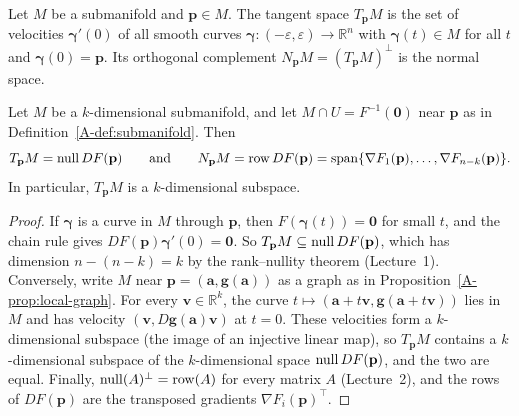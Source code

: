 \begin{definition}\label{A-def:tangent}
    Let $M$ be a submanifold and $\mathbf{p} \in M$. The tangent space $T_{\mathbf{p}}M$ is the set of velocities $\boldsymbol{\gamma}'(0)$ of all smooth curves $\boldsymbol{\gamma}: (-\varepsilon, \varepsilon) \to \mathbb{R}^n$ with $\boldsymbol{\gamma}(t) \in M$ for all $t$ and $\boldsymbol{\gamma}(0) = \mathbf{p}$. Its orthogonal complement $N_{\mathbf{p}}M = (T_{\mathbf{p}}M)^\perp$ is the normal space.
\end{definition}

\begin{theorem}\label{A-thm:tangent-space}
    Let $M$ be a $k$-dimensional submanifold, and let $M \cap U = F^{-1}(\mathbf{0})$ near $\mathbf{p}$ as in Definition~\ref{A-def:submanifold}. Then
    \[T_{\mathbf{p}}M = \operatorname{null} DF(\mathbf{p}) \qquad \text{and} \qquad N_{\mathbf{p}}M = \operatorname{row} DF(\mathbf{p}) = \operatorname{span}\{\nabla F_1(\mathbf{p}), \ldots, \nabla F_{n-k}(\mathbf{p})\}.\]
    In particular, $T_{\mathbf{p}}M$ is a $k$-dimensional subspace.
\end{theorem}

\begin{proof}
    If $\boldsymbol{\gamma}$ is a curve in $M$ through $\mathbf{p}$, then $F(\boldsymbol{\gamma}(t)) = \mathbf{0}$ for small $t$, and the chain rule gives $DF(\mathbf{p})\boldsymbol{\gamma}'(0) = \mathbf{0}$. So $T_{\mathbf{p}}M \subseteq \operatorname{null} DF(\mathbf{p})$, which has dimension $n - (n - k) = k$ by the rank--nullity theorem (Lecture~1). Conversely, write $M$ near $\mathbf{p} = (\mathbf{a}, \mathbf{g}(\mathbf{a}))$ as a graph as in Proposition~\ref{A-prop:local-graph}. For every $\mathbf{v} \in \mathbb{R}^k$, the curve $t \mapsto (\mathbf{a} + t\mathbf{v}, \mathbf{g}(\mathbf{a} + t\mathbf{v}))$ lies in $M$ and has velocity $(\mathbf{v}, D\mathbf{g}(\mathbf{a})\mathbf{v})$ at $t = 0$. These velocities form a $k$-dimensional subspace (the image of an injective linear map), so $T_{\mathbf{p}}M$ contains a $k$-dimensional subspace of the $k$-dimensional space $\operatorname{null} DF(\mathbf{p})$, and the two are equal. Finally, $\operatorname{null}(A)^\perp = \operatorname{row}(A)$ for every matrix $A$ (Lecture~2), and the rows of $DF(\mathbf{p})$ are the transposed gradients $\nabla F_i(\mathbf{p})^\top$.
\end{proof}

